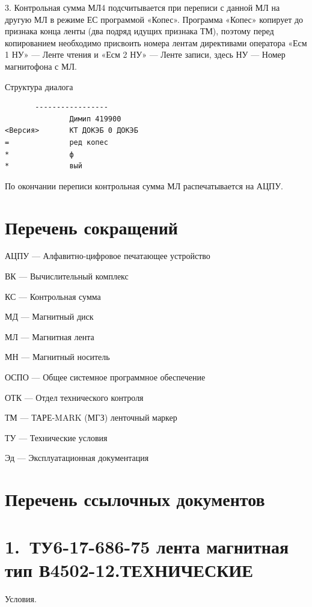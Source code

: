 \documentclass[11pt,a4paper]{article}
\begin{document}
3. Контрольная сумма МЛ4 подсчитывается при переписи с данной МЛ на другую МЛ в режиме ЕС программой «Копес». Программа «Копес» копирует до признака конца ленты (два подряд идущих признака ТМ), поэтому перед копированием необходимо присвоить номера лентам директивами оператора «Есм 1 НУ» --- Ленте чтения и «Есм 2 НУ» --- Ленте записи, здесь НУ --- Номер магнитофона с МЛ.

\begin{center}Структура диалога\end{center}
\begin{center}\small
\begin{BVerbatim}
       -----------------
               Димип 419900
<Версия>       КТ ДОКЭБ 0 ДОКЭБ
=              ред копес
*              ф
*              вый
\end{BVerbatim}
\end{center}

По окончании переписи контрольная сумма МЛ распечатывается на АЦПУ.

\section*{Перечень сокращений}
АЦПУ --- Алфавитно-цифровое печатающее устройство

ВК --- Вычислительный комплекс

КС --- Контрольная сумма

МД --- Магнитный диск

МЛ --- Магнитная лента

МН --- Магнитный носитель

ОСПО --- Общее системное программное обеспечение

ОТК --- Отдел технического контроля

ТМ --- ТАРЕ-MARK (МГЗ) ленточный маркер

ТУ --- Технические условия

Эд --- Эксплуатационная документация

\section*{Перечень ссылочных документов}
\section*{1.~ТУ6-17-686-75 лента магнитная тип В4502-12.ТЕХНИЧЕСКИЕ}
\begin{center}Условия.\end{center}
\end{document}
